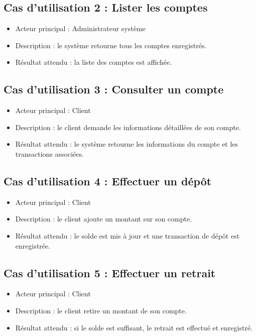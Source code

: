 \documentclass[12pt,a4paper]{article}
\begin{document}
\subsection{Cas d'utilisation 2 : Lister les comptes}

\begin{itemize}
    \item Acteur principal : Administrateur système
    \item Description : le système retourne tous les comptes enregistrés.
    \item Résultat attendu : la liste des comptes est affichée.
\end{itemize}

\subsection{Cas d'utilisation 3 : Consulter un compte}

\begin{itemize}
    \item Acteur principal : Client
    \item Description : le client demande les informations détaillées de son compte.
    \item Résultat attendu : le système retourne les informations du compte et les transactions associées.
\end{itemize}

\subsection{Cas d'utilisation 4 : Effectuer un dépôt}

\begin{itemize}
    \item Acteur principal : Client
    \item Description : le client ajoute un montant sur son compte.
    \item Résultat attendu : le solde est mis à jour et une transaction de dépôt est enregistrée.
\end{itemize}

\subsection{Cas d'utilisation 5 : Effectuer un retrait}

\begin{itemize}
    \item Acteur principal : Client
    \item Description : le client retire un montant de son compte.
    \item Résultat attendu : si le solde est suffisant, le retrait est effectué et enregistré.
\end{itemize}
\end{document}
